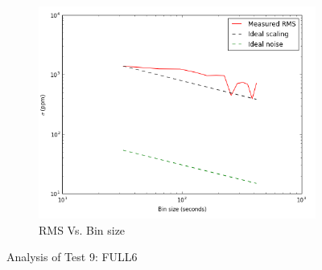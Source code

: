\documentclass{aastex6}
\begin{document}
\begin{figure}[H]
    \begin{subfigure}{3}
        \includegraphics[scale=0.6]{rms_test9}
        \caption{RMS Vs. Bin size}
    \end{subfigure}
    \caption{Analysis of Test 9: FULL6}
\end{figure}
\end{document}
